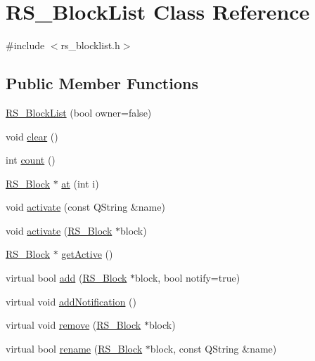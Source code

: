 \hypertarget{classRS__BlockList}{\section{R\-S\-\_\-\-Block\-List Class Reference}
\label{classRS__BlockList}
}


{\ttfamily \#include $<$rs\-\_\-blocklist.\-h$>$}

\subsection*{Public Member Functions}
\begin{DoxyCompactItemize}
\item 
\hyperlink{classRS__BlockList_ab820bd427458a23917f631637e4670fb}{R\-S\-\_\-\-Block\-List} (bool owner=false)
\item 
void \hyperlink{classRS__BlockList_a6ed6a40c8ec3badeb075adc186cb8036}{clear} ()
\item 
int \hyperlink{classRS__BlockList_ababbe604bf7dadd9def61f3658dc1d45}{count} ()
\item 
\hyperlink{classRS__Block}{R\-S\-\_\-\-Block} $\ast$ \hyperlink{classRS__BlockList_a7e4f0ad8ca1a34b4d82197e6ce25a723}{at} (int i)
\item 
void \hyperlink{classRS__BlockList_a53d9528bf27b600657656971b08f6d51}{activate} (const Q\-String \&name)
\item 
void \hyperlink{classRS__BlockList_ab0b9431c8eabb2f49b1a262568c545a5}{activate} (\hyperlink{classRS__Block}{R\-S\-\_\-\-Block} $\ast$block)
\item 
\hyperlink{classRS__Block}{R\-S\-\_\-\-Block} $\ast$ \hyperlink{classRS__BlockList_aed3ffb4c59505c6e94f0f6de59412941}{get\-Active} ()
\item 
virtual bool \hyperlink{classRS__BlockList_a9b8e4ae0f1dbf0dc6cb952fcafc9249b}{add} (\hyperlink{classRS__Block}{R\-S\-\_\-\-Block} $\ast$block, bool notify=true)
\item 
virtual void \hyperlink{classRS__BlockList_af0b0197b2a3e15149669a0ba55d0e22f}{add\-Notification} ()
\item 
virtual void \hyperlink{classRS__BlockList_a9d2f808a681c5e4f47809993541062be}{remove} (\hyperlink{classRS__Block}{R\-S\-\_\-\-Block} $\ast$block)
\item 
virtual bool \hyperlink{classRS__BlockList_a67ced71811f4c5fdb723bad55c90f64f}{rename} (\hyperlink{classRS__Block}{R\-S\-\_\-\-Block} $\ast$block, const Q\-String \&name)
\item 

\end{DoxyCompactItemize}
